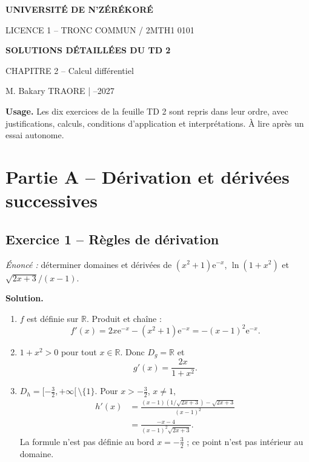 \documentclass[11pt,a4paper,oneside]{article}
\newcommand{\R}{\mathbb R}
\newcommand{\e}{\mathrm e}
\newcommand{\solution}{\textbf{\color{Sarcelle}Solution.}\enspace}
\begin{document}
\begin{tcolorbox}[enhanced,colback=Bleu,colframe=Bleu,boxrule=0pt,sharp corners,left=5mm,right=5mm,top=5mm,bottom=5mm]
\begin{center}
{\color{white}\large\bfseries UNIVERSITÉ DE N'ZÉRÉKORÉ\par}\vspace{.14cm}
{\color{white!85}\normalsize LICENCE 1 -- TRONC COMMUN \quad / \quad 2MTH1 0101\par}\vspace{.30cm}
{\color{white}\LARGE\bfseries SOLUTIONS DÉTAILLÉES DU TD 2\par}\vspace{.14cm}
{\color{white!95}\large CHAPITRE 2 -- Calcul différentiel\par}\vspace{.14cm}
{\color{white!80}\small M. Bakary TRAORE \quad | --2027\par}
\end{center}
\end{tcolorbox}
\begin{objectifbox}
\textbf{Usage.} Les dix exercices de la feuille TD 2 sont repris dans leur ordre, avec justifications, calculs, conditions d'application et interprétations. À lire après un essai autonome.
\end{objectifbox}

\section*{Partie A -- Dérivation et dérivées successives}
\subsection*{Exercice 1 -- Règles de dérivation}
\textit{Énoncé :} déterminer domaines et dérivées de $(x^2+1)\e^{-x}$, $\ln(1+x^2)$ et $\sqrt{2x+3}/(x-1)$.

\solution
\begin{enumerate}[label=\alph*)]
\item $f$ est définie sur $\R$. Produit et chaîne :
\[f'(x)=2x\e^{-x}-(x^2+1)\e^{-x}=\boxed{-(x-1)^2\e^{-x}}.\]
\item $1+x^2>0$ pour tout $x\in\R$. Donc $D_g=\R$ et
\[\boxed{g'(x)=\frac{2x}{1+x^2}}.\]
\item $D_h=[-\frac32,+\infty[\,\setminus\{1\}$. Pour $x>-\frac32$, $x\ne1$,
\begin{align*}
h'(x)&=\frac{(x-1)(1/\sqrt{2x+3})-\sqrt{2x+3}}{(x-1)^2}\\
&=\boxed{\frac{-x-4}{(x-1)^2\sqrt{2x+3}}}.
\end{align*}
La formule n'est pas définie au bord $x=-\frac32$ ; ce point n'est pas intérieur au domaine.
\end{enumerate}
\end{document}
